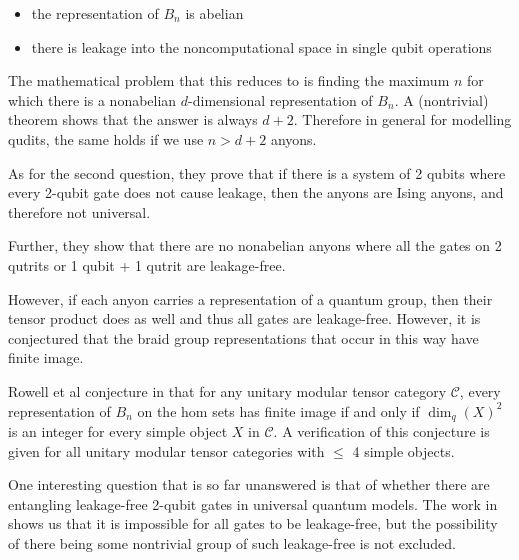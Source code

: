 \begin{itemize}
\item the representation of $B_n$ is abelian
\item there is leakage into the noncomputational space in single qubit operations
\end{itemize}

The mathematical problem that this reduces to is finding the maximum $n$ for
which there is a nonabelian $d$-dimensional representation of $B_n$. A
(nontrivial) theorem shows that the answer is always $d+2$.
Therefore in general for modelling qudits, the same holds if we use $n > d+2$ anyons.

As for the second question, they prove that if there is a system of 2 qubits
where every 2-qubit gate does not cause leakage, then the anyons are Ising
anyons, and therefore not universal.

Further, they show that there are no nonabelian anyons where all the gates on 2
qutrits or 1 qubit + 1 qutrit are leakage-free.

However, if each anyon carries a representation of a quantum group, then their
tensor product does as well and thus all gates are leakage-free. However, it is
conjectured that the braid group representations that occur in this way have
finite image.

Rowell et al conjecture in \cite{Rowell2007} that for any unitary modular
tensor category $\mathcal{C}$, every representation of $B_n$ on the hom sets
has finite image if and only if $\dim_q(X)^2$ is an integer for every simple
object $X$ in $\mathcal{C}$. A verification of this conjecture is given for all
unitary modular tensor categories with $\leq$ 4 simple objects.
       
One interesting question that is so far unanswered is that of whether there are
entangling leakage-free 2-qubit gates in universal quantum models. The work in
\cite{Ainsworth2011} shows us that it is impossible for all gates to be
leakage-free, but the possibility of there being some nontrivial group of such
leakage-free is not excluded. 
